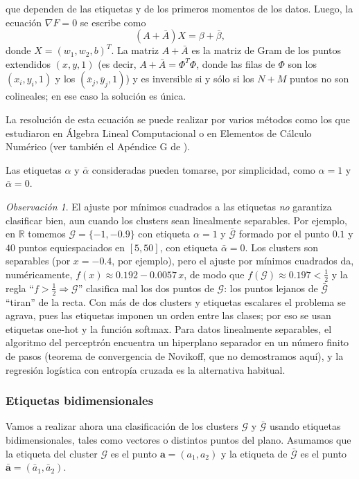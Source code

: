 \documentclass[12pt, a4paper]{amsbook}
\newcommand{\R}{{\mathbb R}}
\newcommand{\G}{{\mathcal G}}
\newcommand{\ab}{{\mathbf a}}
\theoremstyle{remark}
\newtheorem{obs}[teo]{Observaci\'on}
\theoremstyle{definition}
\numberwithin{section}{chapter}
\numberwithin{subsection}{section}
\numberwithin{equation}{section}
\numberwithin{figure}{chapter}
\begin{document}
que dependen de las etiquetas y de los primeros momentos de los datos. Luego, la ecuación $\nabla F=0$ se escribe como
$$
(A+\bar A) X = \beta + \bar\beta,
$$
donde $X=(w_1, w_2, b)^T$. La matriz $A+\bar A$ es la matriz de Gram de los puntos extendidos $(x,y,1)$ (es decir, $A+\bar A=\Phi^T\Phi$, donde las filas de $\Phi$ son los $(x_i,y_i,1)$ y los $(\bar x_j,\bar y_j,1)$) y es inversible si y sólo si los $N+M$ puntos no son colineales; en ese caso la solución es única.

La resolución de esta ecuación se puede realizar por varios métodos como los que estudiaron en Álgebra Lineal Computacional o en Elementos de Cálculo Numérico (ver también el Apéndice G de \cite{Calin}).

Las etiquetas $\alpha$ y $\bar\alpha$ consideradas pueden tomarse, por simplicidad, como $\alpha=1$ y $\bar\alpha = 0$.

\begin{obs}
El ajuste por mínimos cuadrados a las etiquetas {\em no} garantiza clasificar bien, aun cuando los clusters sean linealmente separables. Por ejemplo, en $\R$ tomemos $\G=\{-1,-0.9\}$ con etiqueta $\alpha=1$ y $\bar\G$ formado por el punto $0.1$ y $40$ puntos equiespaciados en $[5,50]$, con etiqueta $\bar\alpha=0$. Los clusters son separables (por $x=-0.4$, por ejemplo), pero el ajuste por mínimos cuadrados da, numéricamente, $f(x)\approx0.192-0.0057\,x$, de modo que $f(\G)\approx0.197<\tfrac12$ y la regla ``$f>\tfrac12\Rightarrow\G$'' clasifica mal los dos puntos de $\G$: los puntos lejanos de $\bar\G$ ``tiran'' de la recta. Con más de dos clusters y etiquetas escalares el problema se agrava, pues las etiquetas imponen un orden entre las clases; por eso se usan etiquetas one-hot y la función softmax. Para datos linealmente separables, el algoritmo del perceptrón encuentra un hiperplano separador en un número finito de pasos (teorema de convergencia de Novikoff, que no demostramos aquí), y la regresión logística con entropía cruzada es la alternativa habitual.
\end{obs}

\subsubsection*{Etiquetas bidimensionales} Vamos a realizar ahora una clasificación de los clusters $\G$ y $\bar\G$ usando etiquetas bidimensionales, tales como vectores o distintos puntos del plano. Asumamos que la etiqueta del cluster $\G$ es el punto $\ab=(a_1, a_2)$ y la etiqueta de $\bar\G$ es el punto $\bar\ab=(\bar a_1, \bar a_2)$.
\end{document}
